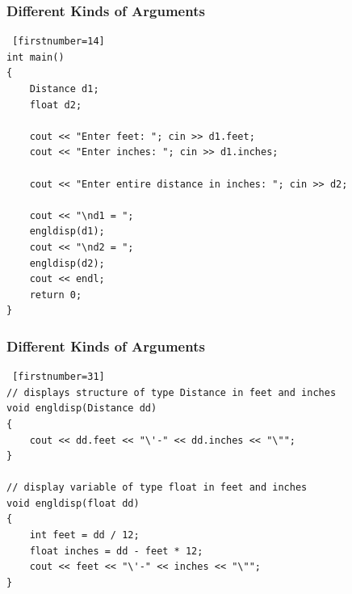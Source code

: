 \documentclass{beamer}
\begin{document}
\begin{frame}[fragile]\frametitle{Different Kinds of Arguments}
    \lstset{style=mystyle}
\begin{lstlisting} [firstnumber=14]
int main()
{
    Distance d1;
    float d2;

    cout << "Enter feet: "; cin >> d1.feet;
    cout << "Enter inches: "; cin >> d1.inches;

    cout << "Enter entire distance in inches: "; cin >> d2;

    cout << "\nd1 = ";
    engldisp(d1);
    cout << "\nd2 = ";
    engldisp(d2);
    cout << endl;
    return 0;
}
\end{lstlisting}
\end{frame}

\begin{frame}[fragile]\frametitle{Different Kinds of Arguments}
    \lstset{style=mystyle}
\begin{lstlisting} [firstnumber=31]
// displays structure of type Distance in feet and inches
void engldisp(Distance dd)
{
    cout << dd.feet << "\'-" << dd.inches << "\"";
}

// display variable of type float in feet and inches
void engldisp(float dd)
{
    int feet = dd / 12;
    float inches = dd - feet * 12;
    cout << feet << "\'-" << inches << "\"";
}
\end{lstlisting}
\end{frame}
\end{document}
